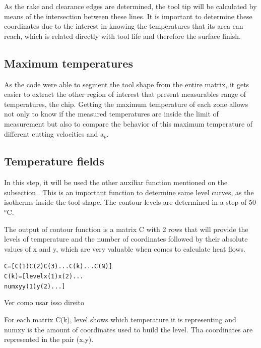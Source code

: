 		As the rake and clearance edges are determined, the tool tip will be calculated by means of the intersection between these lines. It is important to determine these coordinates due to the interest in knowing the temperatures that its area can reach, which is related directly with tool life and therefore the surface finish.

	\subsection{Maximum temperatures}

	As the code were able to segment the tool shape from the entire matrix, it gets easier to extract the other region of interest that present measurables range of temperatures, the chip. Getting the maximum temperature of each zone allows not only to know if the measured temperatures are inside the limit of measurement but also to compare the behavior of this maximum temperature of different cutting velocities and a$_{p}$.

	\subsection{Temperature fields}

	In this step, it will be used the other auxiliar function mentioned on the subsection . This is an important function to determine same level curves, as the isotherms inside the tool shape. The contour levels are determined in a step of 50 $^{o}$C.

	
	

	The output of contour function is a matrix C with 2 rows that will provide the levels of temperature and the number of coordinates followed by their absolute values of x and y, which are very valuable when comes to calculate heat flows.

		\begin{mdframed}[backgroundcolor=lightgray!25!]
		\begin{alltt}\fontsize{9pt}{8pt}\selectfont
C = 	[C(1) C(2) C(3) ...C(k)... C(N)]
C(k) =  [level x(1) x(2)...
		 numxy y(1) y(2)...]
		\end{alltt}
		\end{mdframed}
	Ver como usar isso direito
	
	For each matrix C(k), level shows which temperature it is representing and numxy is the amount of coordinates used to build the level. Tha coordinates are represented in the pair (x,y).


